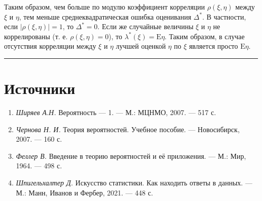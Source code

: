 \documentclass[11pt,a4paper]{article}
\providecommand{\tightlist}{%
      \setlength{\itemsep}{0pt}\setlength{\parskip}{0pt}}
\begin{document}
Таким образом, чем больше по модулю коэффициент корреляции
\(\rho(\xi, \eta)\) между \(\xi\) и \(\eta\), тем меньше
среднеквадратическая ошибка оценивания \(\Delta^\ast\). В частности,
если \(|\rho(\xi, \eta)|=1\), то \(\Delta^\ast = 0\). Если же случайные
величины \(\xi\) и \(\eta\) не коррелированы (т. е.
\(\rho(\xi, \eta)=0\)), то \(\lambda^\ast(\xi) = \mathrm{E}\eta\). Таким
образом, в случае отсутствия корреляции между \(\xi\) и \(\eta\) лучшей
оценкой \(\eta\) по \(\xi\) является просто \(\mathrm{E}\eta\).

    \begin{center}\rule{0.5\linewidth}{0.5pt}\end{center}

    \hypertarget{ux438ux441ux442ux43eux447ux43dux438ux43aux438}{%
\section{Источники}\label{ux438ux441ux442ux43eux447ux43dux438ux43aux438}}

\begin{enumerate}
\def\labelenumi{\arabic{enumi}.}
\tightlist
\item
  \emph{Ширяев А.Н.} Вероятность --- 1. --- М.: МЦНМО, 2007. --- 517 с.
\item
  \emph{Чернова Н. И.} Теория вероятностей. Учебное пособие. ---
  Новосибирск, 2007. --- 160 с.
\item
  \emph{Феллер В.} Введение в теорию вероятностей и её приложения. ---
  М.: Мир, 1964. --- 498 с.
\item
  \emph{Шпигельхалтер Д.} Искусство статистики. Как находить ответы в
  данных. --- М.: Манн, Иванов и Фербер, 2021. --- 448 с.
\end{enumerate}


    
    
    
\end{document}
